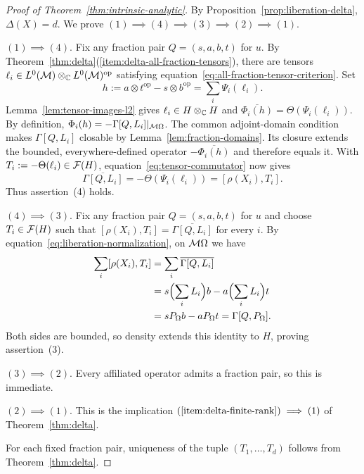 \begin{proof}[Proof of Theorem~\ref{thm:intrinsic-analytic}]
By Proposition~\ref{prop:liberation-delta}, $\Delta(X)=d$.
We prove $(1)\implies(4)\implies(3)\implies(2)\implies(1)$.

$(1)\implies(4)$.
Fix any fraction pair $Q=(s,a,b,t)$ for $u$.
By Theorem~\ref{thm:delta}\textup{(\ref{item:delta-all-fraction-tensors})}, there are tensors $\ell_i\in L^0(\mathcal M)\otimes_{\mathbb C}L^0(\mathcal M)^{\mathrm{op}}$ satisfying equation~\eqref{eq:all-fraction-tensor-criterion}.
Set
\[
 h:=a\otimes t^{\mathrm{op}}-s\otimes b^{\mathrm{op}}
   =\sum_i\Psi_i(\ell_i).
\]
Lemma~\ref{lem:tensor-images-l2} gives $\ell_i\in H\otimes_{\mathbb C}H$ and $\overline{\Phi_i(h)}=\Theta(\Psi_i(\ell_i))$.
By definition, $\Phi_i(h)=-\Gamma[Q,L_i]|_{\mathcal M\Omega}$.
The common adjoint-domain condition makes $\Gamma[Q,L_i]$ closable by Lemma~\ref{lem:fraction-domains}.
Its closure extends the bounded, everywhere-defined operator $-\overline{\Phi_i(h)}$ and therefore equals it.
With $T_i:=-\Theta(\ell_i)\in\mathcal F(H)$, equation~\eqref{eq:tensor-commutator} now gives
\[
 \overline{\Gamma[Q,L_i]}
 =-\Theta(\Psi_i(\ell_i))
 =[\rho(X_i),T_i].
\]
Thus assertion~\textup{(4)} holds.

$(4)\implies(3)$.
Fix any fraction pair $Q=(s,a,b,t)$ for $u$ and choose $T_i\in\mathcal F(H)$ such that
$[\rho(X_i),T_i]=\overline{\Gamma[Q,L_i]}$ for every $i$.
By equation~\eqref{eq:liberation-normalization}, on $\mathcal M\Omega$ we have
\[
 \begin{aligned}
  \sum_i[\rho(X_i),T_i]
  &=\sum_i\overline{\Gamma[Q,L_i]}\\
  &=s\Bigl(\sum_iL_i\Bigr)b-a\Bigl(\sum_iL_i\Bigr)t\\
  &=sP_\Omega b-aP_\Omega t
   =\Gamma[Q,P_\Omega].
 \end{aligned}
\]
Both sides are bounded, so density extends this identity to $H$, proving assertion~\textup{(3)}.

$(3)\implies(2)$.
Every affiliated operator admits a fraction pair, so this is immediate.

$(2)\implies(1)$.
This is the implication $\textup{(\ref{item:delta-finite-rank})}\implies\textup{(1)}$ of Theorem~\ref{thm:delta}.

For each fixed fraction pair, uniqueness of the tuple $(T_1,\ldots,T_d)$ follows from Theorem~\ref{thm:delta}.
\end{proof}
